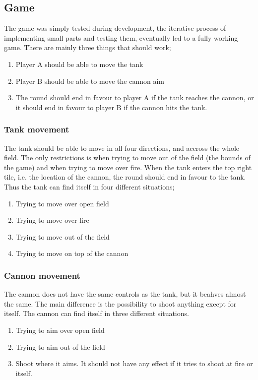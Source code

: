 \subsection{Game}
The game was simply tested during development, the iterative process of implementing
small parts and testing them, eventually led to a fully working game. There are
mainly three things that should work;
\begin{enumerate}
  \item Player A should be able to move the tank
  \item Player B should be able to move the cannon aim
  \item The round should end in favour to player A if the tank reaches the cannon, or it
	should end in favour to player B if the cannon hits the tank.
\end{enumerate}

\subsubsection{Tank movement}
The tank should be able to move in all four directions, and accross the whole field. The only
restrictions is when trying to move out of the field (the bounds of the game) and when
trying to move over fire. When the tank enters the top right tile, i.e. the location of the
cannon, the round should end in favour to the tank. Thus the tank can find itself in four
different situations;
\begin{enumerate}
  \item Trying to move over open field
  \item Trying to move over fire
  \item Trying to move out of the field
  \item Trying to move on top of the cannon
\end{enumerate}

\subsubsection{Cannon movement}
The cannon does not have the same controls as the tank, but it beahves almost the same.
The main difference is the possibility to shoot anything execpt for itself.
The cannon can find itself in three different situations.
\begin{enumerate}
  \item Trying to aim over open field
  \item Trying to aim out of the field
  \item Shoot where it aims. It should not have any effect if it tries to shoot at fire
  or itself.
\end{enumerate}

